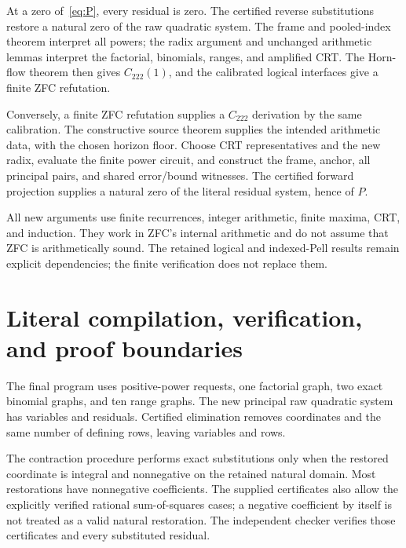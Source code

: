 \documentclass[11pt]{article}
\theoremstyle{definition}\newtheorem{definition}[theorem]{Definition}
\theoremstyle{remark}\newtheorem{remark}[theorem]{Remark}
\begin{document}
At a zero of~\eqref{eq:P}, every residual is zero. The certified reverse substitutions restore a natural zero of the raw quadratic system. The frame and pooled-index theorem interpret all powers; the radix argument and unchanged arithmetic lemmas interpret the factorial, binomials, ranges, and amplified CRT. The Horn-flow theorem then gives $C_{222}(1)$, and the calibrated logical interfaces give a finite ZFC refutation.

Conversely, a finite ZFC refutation supplies a $C_{222}$ derivation by the same calibration. The constructive source theorem supplies the intended arithmetic data, with the chosen horizon floor. Choose CRT representatives and the new radix, evaluate the finite power circuit, and construct the frame, anchor, all principal pairs, and shared error/bound witnesses. The certified forward projection supplies a natural zero of the literal residual system, hence of $P$.

All new arguments use finite recurrences, integer arithmetic, finite maxima, CRT, and induction. They work in ZFC's internal arithmetic and do not assume that ZFC is arithmetically sound. The retained logical and indexed-Pell results remain explicit dependencies; the finite verification does not replace them.

\section{Literal compilation, verification, and proof boundaries}

The final program uses \PowerCount{} positive-power requests, one factorial graph, two exact binomial graphs, and ten range graphs. The new principal raw quadratic system has \RawVars{} variables and \RawRows{} residuals. Certified elimination removes \Eliminations{} coordinates and the same number of defining rows, leaving \NumVars{} variables and \NumRows{} rows.

The contraction procedure performs exact substitutions only when the restored coordinate is integral and nonnegative on the retained natural domain. Most restorations have nonnegative coefficients. The supplied certificates also allow the explicitly verified rational sum-of-squares cases; a negative coefficient by itself is not treated as a valid natural restoration. The independent checker verifies those certificates and every substituted residual.
\end{document}
